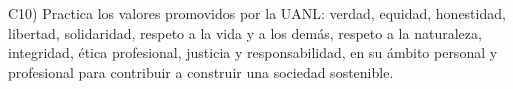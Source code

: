 C10) Practica los valores promovidos por la UANL: verdad, equidad,
honestidad, libertad, solidaridad, respeto a la vida y a los dem\'{a}s,
respeto a la naturaleza, integridad, \'{e}tica profesional, justicia y
responsabilidad, en su \'{a}mbito personal y profesional para contribuir a
construir una sociedad sostenible.
